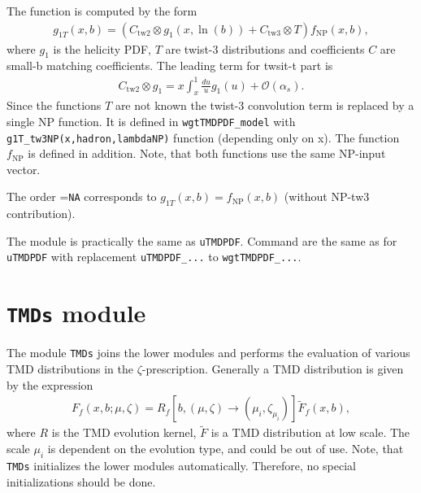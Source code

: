 \documentclass[prd,nofootinbib,eqsecnum,final]{revtex4}
\renewcommand{\(}{\left(}
\renewcommand{\)}{\right)}
\renewcommand{\[}{\left[}
\renewcommand{\]}{\right]}
\begin{document}
The function is computed by the form
\begin{eqnarray}
g_{1T}(x,b)=\(C_{\text{tw2}}\otimes g_1(x,\ln(b))+C_{\text{tw3}}\otimes T\) f_{\text{NP}}(x,b),
\end{eqnarray}
where $g_1$ is the helicity PDF, $T$ are twist-3 distributions and coefficients $C$ are small-b matching coefficients. The leading term for twsit-t part is
\begin{eqnarray}
C_{\text{tw2}}\otimes g_1=x\int_x^1 \frac{du}{u}g_1(u)+\mathcal{O}(\alpha_s).
\end{eqnarray}
Since the functions $T$ are not known the twist-3 convolution term is replaced by a single NP function. It is defined in \texttt{wgtTMDPDF\_model} with \texttt{g1T\_tw3NP(x,hadron,lambdaNP)} function (depending only on x). The function $f_{\text{NP}}$ is defined in addition. Note, that both functions use the same NP-input vector.

The order =\texttt{NA} corresponds to $g_{1T}(x,b)=f_{\text{NP}}(x,b)$ (without NP-tw3 contribution).

The module is practically the same as \texttt{uTMDPDF}. Command are the same as for \texttt{uTMDPDF} with replacement \texttt{uTMDPDF\_...} to \texttt{wgtTMDPDF\_...}.

\renewcommand{\arraystretch}{1.5}
\newpage


\section{\texttt{TMDs} module}
\label{TMDs}

The module \texttt{TMDs} joins the lower modules and performs the evaluation of various TMD distributions in the $\zeta$-prescription. Generally a TMD distribution is given by the expression
\begin{eqnarray}
F_f(x,b;\mu,\zeta)=R_f[b,(\mu,\zeta)\to(\mu_i,\zeta_{\mu_i})]\tilde F_f(x,b),
\end{eqnarray}
where $R$ is the TMD evolution kernel, $\tilde F$ is a TMD distribution at low scale. The scale $\mu_i$ is dependent on the evolution type, and could be out of use. Note, that \texttt{TMDs} initializes the lower modules automatically. Therefore, no special initializations should be done.
\end{document}
